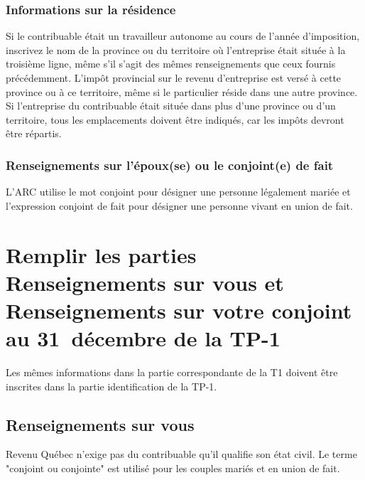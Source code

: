 \subsubsection{Informations sur la résidence}
Si le contribuable était un travailleur autonome au cours de l'année d'imposition, inscrivez le nom de la province ou du territoire où l'entreprise était située à la troisième ligne, même s'il s'agit des mêmes renseignements que ceux fournis précédemment. L'impôt provincial sur le revenu d'entreprise est versé à cette province ou à ce territoire, même si le particulier réside dans une autre province. Si l'entreprise du contribuable était située dans plus d'une province ou d'un territoire, tous les emplacements doivent être indiqués, car les impôts devront être répartis.

\subsubsection{Renseignements sur l'époux(se) ou le conjoint(e) de fait}
\ca
L'ARC utilise le mot \og conjoint\fg{} pour désigner une personne légalement mariée et l'expression \og conjoint de fait\fg{} pour désigner une personne vivant en union de fait. 



\section{Remplir les parties \og Renseignements sur vous\fg{} et  \og Renseignements sur votre conjoint au 31~décembre\fg{} de la TP-1}
\begin{intro}
	Les mêmes informations dans la partie correspondante de la T1 doivent être inscrites dans la partie identification de la TP-1.
\end{intro}


\subsection{Renseignements sur vous}
Revenu Québec n'exige pas du contribuable qu'il qualifie son état civil. Le terme "conjoint ou conjointe" est utilisé pour les couples mariés et en union de fait.



